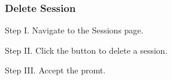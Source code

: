 \subsubsection{Delete Session}

\begin{userManualItemlist}
	\item[Step I.] Navigate to the Sessions page.
	\item[Step II.] Click the button to delete a session.
	\item[Step III.] Accept the promt.
\end{userManualItemlist}